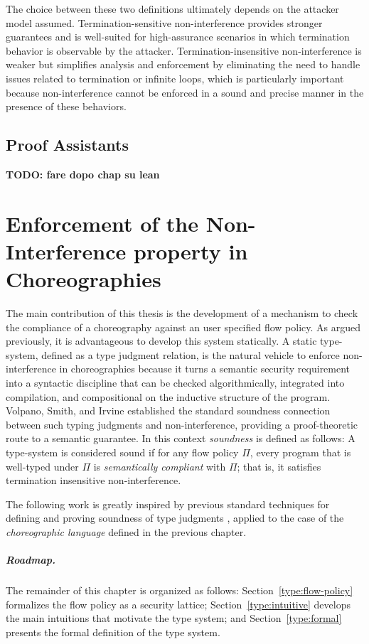 \documentclass[12pt,a4paper,twoside]{book}
\begin{document}
The choice between these two definitions ultimately depends on the attacker model assumed. Termination-sensitive non-interference provides stronger guarantees and is well-suited for high-assurance scenarios in which termination behavior is observable by the attacker.
Termination-insensitive non-interference is weaker but simplifies analysis and enforcement by eliminating the need to handle issues related to termination or infinite loops, which is particularly important because non-interference cannot be enforced in a sound and precise manner in the presence of these behaviors\cite{ngo2018impossibility}.

\section{Proof Assistants}
\textbf{TODO: fare dopo chap su lean}

\chapter{Enforcement of the Non-Interference property in Choreographies}
The main contribution of this thesis is the development of a mechanism to check the compliance of a choreography against an user specified flow policy.
As argued previously, it is advantageous to develop this system statically.
A static type-system, defined as a type judgment relation, is the natural vehicle to enforce non-interference in choreographies because it turns a semantic security requirement into a syntactic discipline that can be checked algorithmically, integrated into compilation, and compositional on the inductive structure of the program.
Volpano, Smith, and Irvine\cite{volpano1996sound} established the standard soundness connection between such typing judgments and non-interference, providing a proof-theoretic route to a semantic guarantee. In this context \textit{soundness} is defined as follows: 
A type-system is considered sound if for any flow policy $\Pi$, every program that is well-typed under $\Pi$ is \textit{semantically compliant} with $\Pi$; that is, it satisfies termination insensitive non-interference.

The following work is greatly inspired by previous standard techniques for defining and proving soundness of type judgments \cite{myers2011proving}\cite{wright1994syntactic}, applied to the case of the \emph{choreographic language} defined in the previous chapter.

\paragraph{Roadmap.}
The remainder of this chapter is organized as follows: Section~\ref{type:flow-policy} formalizes the flow policy as a security lattice; Section~\ref{type:intuitive} develops the main intuitions that motivate the type system; and Section~\ref{type:formal} presents the formal definition of the type system.
\end{document}
